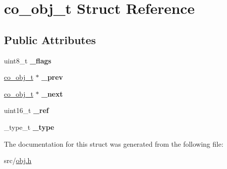 \hypertarget{structco__obj__t}{\section{co\+\_\+obj\+\_\+t Struct Reference}
\label{structco__obj__t}
}
\subsection*{Public Attributes}
\begin{DoxyCompactItemize}
\item 
\hypertarget{structco__obj__t_a4d8626e624751a210bf831620c1a6f0b}{uint8\+\_\+t {\bfseries \+\_\+flags}}\label{structco__obj__t_a4d8626e624751a210bf831620c1a6f0b}

\item 
\hypertarget{structco__obj__t_a2b02f1ab03451cba6ff25879e5da5c81}{\hyperlink{structco__obj__t}{co\+\_\+obj\+\_\+t} $\ast$ {\bfseries \+\_\+prev}}\label{structco__obj__t_a2b02f1ab03451cba6ff25879e5da5c81}

\item 
\hypertarget{structco__obj__t_a730bd99f3fea72a2368c557b3d618c86}{\hyperlink{structco__obj__t}{co\+\_\+obj\+\_\+t} $\ast$ {\bfseries \+\_\+next}}\label{structco__obj__t_a730bd99f3fea72a2368c557b3d618c86}

\item 
\hypertarget{structco__obj__t_a1aa12ce777f1749d57145526e1b94e54}{uint16\+\_\+t {\bfseries \+\_\+ref}}\label{structco__obj__t_a1aa12ce777f1749d57145526e1b94e54}

\item 
\hypertarget{structco__obj__t_a190bb62df2e9fed4b3d67177d03dda0d}{\+\_\+type\+\_\+t {\bfseries \+\_\+type}}\label{structco__obj__t_a190bb62df2e9fed4b3d67177d03dda0d}

\end{DoxyCompactItemize}


The documentation for this struct was generated from the following file\+:\begin{DoxyCompactItemize}
\item 
src/\hyperlink{obj_8h}{obj.\+h}\end{DoxyCompactItemize}
